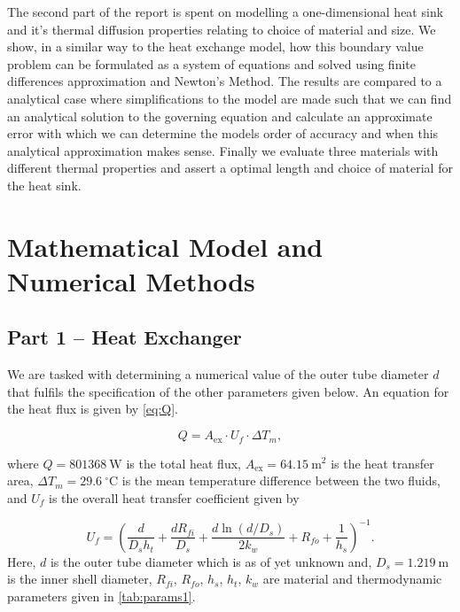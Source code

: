 \documentclass[11pt, a4paper]{article}
\theoremstyle{definition}
\begin{document}
The second part of the report is spent on modelling a one-dimensional heat sink and it's thermal diffusion properties relating to choice of material and size. We show, in a similar way to the heat exchange model, how this boundary value problem can be formulated as a system of equations and solved using finite differences approximation and Newton's Method. The results are compared to a analytical case where simplifications to the model are made such that we can find an analytical solution to the governing equation and calculate an approximate error with which we can determine the models order of accuracy and when this analytical approximation makes sense. Finally we evaluate three materials with different thermal properties and assert a optimal length and choice of material for the heat sink.
\section{Mathematical Model and Numerical Methods}
\subsection{Part 1 -- Heat Exchanger}
We are tasked with determining a numerical value of the outer
tube diameter $d$ that fulfils the specification of the other
parameters given below. An equation for the heat flux is given by \cref{eq:Q}.

\begin{equation}
  Q = A_{\mathrm{ex}} \cdot U_f \cdot \Delta T_m,
  \label{eq:Q}
\end{equation}

where $Q = 801368\ \mathrm{W}$ is the total heat flux,
$A_{\mathrm{ex}} = 64.15\ \mathrm{m}^2$ is the heat transfer area,
$\Delta T_m = 29.6\ ^\circ\mathrm{C}$ is the mean temperature difference
between the two fluids, and $U_f$ is the overall heat transfer coefficient
given by

\begin{equation}
  U_f = \left(
    \frac{d}{D_s h_t}
    + \frac{d R_{fi}}{D_s}
    + \frac{d \ln(d/D_s)}{2k_w}
    + R_{fo} + \frac{1}{h_s}
  \right)^{-1}.
  \label{eq:Uf}
\end{equation}
Here, $d$ is the outer tube diameter which is as of yet unknown and, $D_s = 1.219\ \mathrm{m}$
is the inner shell diameter, $R_{fi}$, $R_{fo}$, $h_s$, $h_t$, $k_w$ are
material and thermodynamic parameters given in \cref{tab:params1}.
\end{document}

